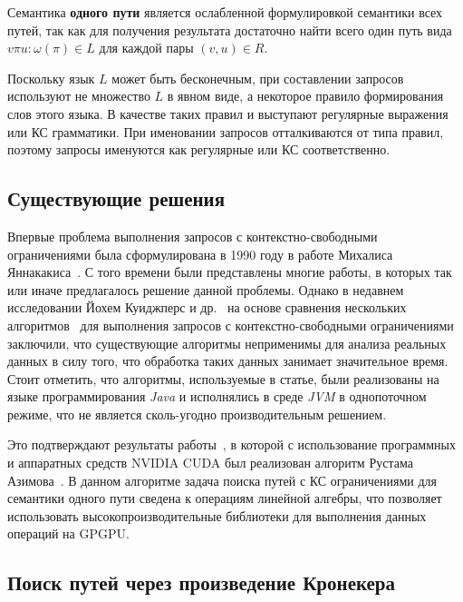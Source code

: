 \documentclass[14pt]{matmex-diploma-custom}
\begin{document}
Семантика \textbf{одного пути} является ослабленной формулировкой семантики всех путей, так как для получения результата достаточно найти всего один путь вида $v \pi u : \omega (\pi) \in L$ для каждой пары $(v, u) \in R$.

Поскольку язык $L$ может быть бесконечным, при составлении запросов используют не множество $L$ в явном виде, а некоторое правило формирования слов этого языка. В качестве таких правил и выступают регулярные выражения или КС грамматики. При именовании запросов отталкиваются от типа правил, поэтому запросы именуются как регулярные или КС соответственно.

\subsection{Существующие решения}

Впервые проблема выполнения запросов с контекстно-свободными ограничениями была сформулирована в 1990 году в работе Михалиса Яннакакиса~\cite{inproceedings:yannakakis_cfpq_problem}. С того времени были представлены многие работы, в которых так или иначе предлагалось решение данной проблемы. Однако в недавнем исследовании Йохем Куиджперс и др.~\cite{article:kuijpers_cfpq_exp_compare} на основе сравнения нескольких алгоритмов~\cite{article:hellings_cfpq,inproceedings:matrix_cfpq,inbook:santos_cfpq_lr_analysis} для выполнения запросов с контекстно-свободными ограничениями заключили, что существующие алгоритмы неприменимы для анализа реальных данных в силу того, что обработка таких данных занимает значительное время. Стоит отметить, что алгоритмы, используемые в статье, были реализованы на языке программирования \textit{Java} и исполнялись в среде \textit{JVM} в однопоточном режиме, что не является сколь-угодно производительным решением.

Это подтверждают результаты работы~\cite{inproceedings:cfqp_matrix_with_single_source}, в которой с использование программных и аппаратных средств NVIDIA CUDA был реализован алгоритм Рустама Азимова~\cite{inproceedings:matrix_cfpq}. В данном алгоритме задача поиска путей с КС ограничениями для семантики одного пути сведена к операциям линейной алгебры, что позволяет использовать высокопроизводительные библиотеки для выполнения данных операций на GPGPU.

\subsection{Поиск путей через произведение Кронекера}
\end{document}
